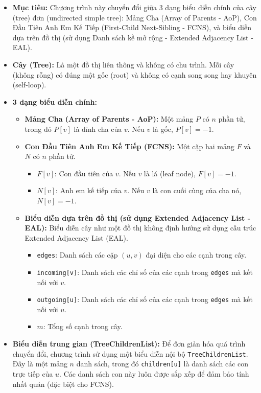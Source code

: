 \documentclass{article}
\begin{document}
\begin{itemize}
    \item \textbf{Mục tiêu:} Chương trình này chuyển đổi giữa 3 dạng biểu diễn chính của cây (tree) đơn (undirected simple tree): Mảng Cha (Array of Parents - AoP), Con Đầu Tiên Anh Em Kế Tiếp (First-Child Next-Sibling - FCNS), và biểu diễn dựa trên đồ thị (sử dụng Danh sách kề mở rộng - Extended Adjacency List - EAL).
    \item \textbf{Cây (Tree):} Là một đồ thị liên thông và không có chu trình. Mỗi cây (không rỗng) có đúng một gốc (root) và không có cạnh song song hay khuyên (self-loop).
    \item \textbf{3 dạng biểu diễn chính:}
    \begin{itemize}
        \item \textbf{Mảng Cha (Array of Parents - AoP):} Một mảng $P$ có $n$ phần tử, trong đó $P[v]$ là đỉnh cha của $v$. Nếu $v$ là gốc, $P[v] = -1$.
        \item \textbf{Con Đầu Tiên Anh Em Kế Tiếp (FCNS):} Một cặp hai mảng $F$ và $N$ có $n$ phần tử.
        \begin{itemize}
            \item $F[v]$: Con đầu tiên của $v$. Nếu $v$ là lá (leaf node), $F[v] = -1$.
            \item $N[v]$: Anh em kế tiếp của $v$. Nếu $v$ là con cuối cùng của cha nó, $N[v] = -1$.
        \end{itemize}
        \item \textbf{Biểu diễn dựa trên đồ thị (sử dụng Extended Adjacency List - EAL):} Biểu diễn cây như một đồ thị không định hướng sử dụng cấu trúc Extended Adjacency List (EAL).
        \begin{itemize}
            \item \texttt{edges}: Danh sách các cặp $(u,v)$ đại diện cho các cạnh trong cây.
            \item \texttt{incoming[v]}: Danh sách các chỉ số của các cạnh trong \texttt{edges} mà kết nối với $v$.
            \item \texttt{outgoing[u]}: Danh sách các chỉ số của các cạnh trong \texttt{edges} mà kết nối với $u$.
            \item $m$: Tổng số cạnh trong cây.
        \end{itemize}
    \end{itemize}
    \item \textbf{Biểu diễn trung gian (TreeChildrenList):} Để đơn giản hóa quá trình chuyển đổi, chương trình sử dụng một biểu diễn nội bộ \texttt{TreeChildrenList}. Đây là một mảng $n$ danh sách, trong đó \texttt{children[u]} là danh sách các con trực tiếp của $u$. Các danh sách con này luôn được sắp xếp để đảm bảo tính nhất quán (đặc biệt cho FCNS).
\end{itemize}
\end{document}
